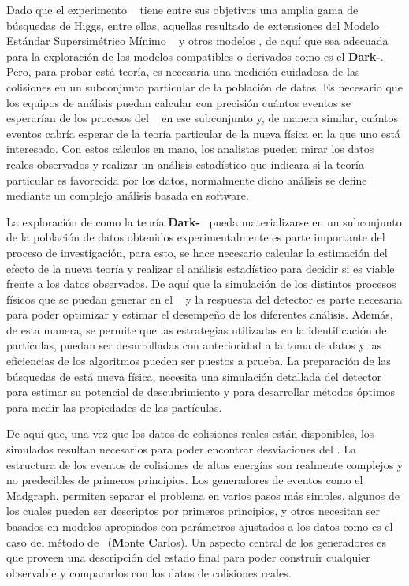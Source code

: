 Dado que el experimento \LHC ~ tiene entre sus objetivos una amplia gama de búsquedas de Higgs, entre ellas, aquellas resultado de extensiones del Modelo Estándar Supersimétrico Mínimo \MSSM~ y otros modelos \SUSY, de aquí que sea adecuada para la exploración de los modelos compatibles o derivados como es el \textbf{Dark-}\SUSY. Pero, para probar está teoría, es necesaria una medición cuidadosa de las colisiones en un subconjunto particular de la población de datos. Es necesario que los equipos de análisis puedan calcular con precisión cuántos eventos se esperarían de los procesos del \ME~ en ese subconjunto y, de manera similar, cuántos eventos cabría esperar de la teoría particular de la nueva física en la que uno está interesado. Con estos cálculos en mano, los analistas pueden mirar los datos reales observados y realizar un análisis estadístico que indicara si la teoría particular es favorecida por los datos, normalmente dicho análisis se define mediante un complejo análisis basada en software. %

La exploración de como la teoría \textbf{Dark-}\SUSY ~ pueda materializarse en un subconjunto de la población de datos obtenidos experimentalmente es parte importante del proceso de investigación, para esto, se hace necesario calcular la estimación del efecto de la nueva teoría y realizar el análisis estadístico para decidir si es viable frente a los datos observados. De aquí que la simulación de los distintos procesos físicos que se puedan generar en el \LHC ~ y la respuesta del detector es parte necesaria para poder optimizar y estimar el desempeño de los diferentes análisis. Además, de esta manera, se permite que las estrategias utilizadas en la identificación de partículas, puedan ser desarrolladas con anterioridad a la toma de datos y las eficiencias de los algoritmos pueden ser puestos a prueba. La preparación de las búsquedas de está nueva física, necesita una simulación detallada del detector para estimar su potencial de descubrimiento y para desarrollar métodos óptimos para medir las propiedades de las partículas.

De aquí que, una vez que los datos de colisiones reales están disponibles, los simulados resultan necesarios para poder encontrar desviaciones del \ME. La estructura de los eventos de colisiones de altas energías son realmente complejos y no predecibles de primeros principios. Los generadores de eventos como el Madgraph, permiten separar el problema en varios pasos más simples, algunos de los cuales pueden ser descriptos por primeros principios, y otros necesitan ser basados en modelos apropiados con parámetros ajustados a los datos como es el caso del método de \MC ~(\textbf{M}onte \textbf{C}arlos). Un aspecto central de los generadores es que proveen una descripción del estado final para poder construir cualquier observable y compararlos con los datos de colisiones reales.

